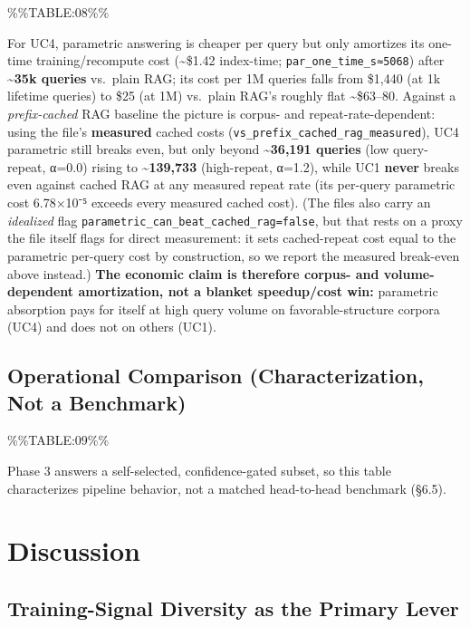 \%\%TABLE:08\%\%

For UC4, parametric answering is cheaper per query but only amortizes its one-time training/recompute cost (\textasciitilde\$1.42 index-time; \texttt{par\_one\_time\_s≈5068}) after \textbf{\textasciitilde35k queries} vs.~plain RAG; its cost per 1M queries falls from \$1,440 (at 1k lifetime queries) to \$25 (at 1M) vs.~plain RAG's roughly flat \textasciitilde\$63--80. Against a \emph{prefix-cached} RAG baseline the picture is corpus- and repeat-rate-dependent: using the file's \textbf{measured} cached costs (\texttt{vs\_prefix\_cached\_rag\_measured}), UC4 parametric still breaks even, but only beyond \textbf{\textasciitilde36,191 queries} (low query-repeat, α=0.0) rising to \textbf{\textasciitilde139,733} (high-repeat, α=1.2), while UC1 \textbf{never} breaks even against cached RAG at any measured repeat rate (its per-query parametric cost 6.78×10⁻⁵ exceeds every measured cached cost). (The files also carry an \emph{idealized} flag \texttt{parametric\_can\_beat\_cached\_rag=false}, but that rests on a proxy the file itself flags for direct measurement: it sets cached-repeat cost equal to the parametric per-query cost by construction, so we report the measured break-even above instead.) \textbf{The economic claim is therefore corpus- and volume-dependent amortization, not a blanket speedup/cost win:} parametric absorption pays for itself at high query volume on favorable-structure corpora (UC4) and does not on others (UC1).

\hypertarget{operational-comparison-characterization-not-a-benchmark}{%
\subsection{Operational Comparison (Characterization, Not a Benchmark)}\label{operational-comparison-characterization-not-a-benchmark}}

\%\%TABLE:09\%\%

Phase 3 answers a self-selected, confidence-gated subset, so this table characterizes pipeline behavior, not a matched head-to-head benchmark (§6.5).

\hypertarget{discussion}{%
\section{Discussion}\label{discussion}}

\hypertarget{training-signal-diversity-as-the-primary-lever}{%
\subsection{Training-Signal Diversity as the Primary Lever}\label{training-signal-diversity-as-the-primary-lever}}

